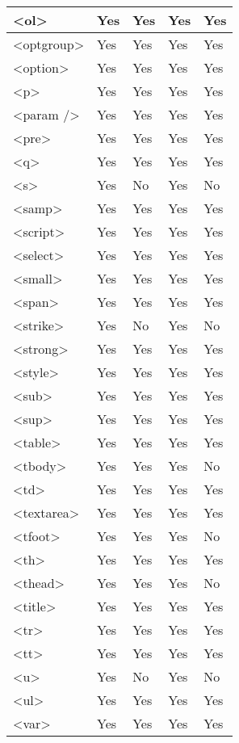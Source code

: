 \begin{longtable}{|l|l|l|l|l|}
\hline
<ol>					&Yes			&Yes	&Yes				&Yes	\\
\hline
<optgroup>			&Yes			&Yes	&Yes				&Yes	\\
\hline
<option>				&Yes			&Yes	&Yes				&Yes	\\
\hline
<p>					&Yes			&Yes	&Yes				&Yes	\\
\hline
<param />			&Yes			&Yes	&Yes				&Yes	\\
\hline
<pre>				&Yes			&Yes	&Yes				&Yes	\\
\hline
<q>					&Yes			&Yes	&Yes				&Yes	\\
\hline
<s>					&Yes			&No		&Yes				&No		\\
\hline
<samp>				&Yes			&Yes	&Yes				&Yes	\\
\hline
<script>				&Yes			&Yes	&Yes				&Yes	\\
\hline
<select>				&Yes			&Yes	&Yes				&Yes	\\
\hline
<small>				&Yes			&Yes	&Yes				&Yes	\\
\hline
<span>				&Yes			&Yes	&Yes				&Yes	\\
\hline
<strike>				&Yes			&No		&Yes				&No		\\
\hline
<strong>				&Yes			&Yes	&Yes				&Yes	\\
\hline
<style>				&Yes			&Yes	&Yes				&Yes	\\
\hline
<sub>				&Yes			&Yes	&Yes				&Yes	\\
\hline
<sup>				&Yes			&Yes	&Yes				&Yes	\\
\hline
<table>				&Yes			&Yes	&Yes				&Yes	\\
\hline
<tbody>				&Yes			&Yes	&Yes				&No		\\
\hline
<td>					&Yes			&Yes	&Yes				&Yes	\\
\hline
<textarea>			&Yes			&Yes	&Yes				&Yes	\\
\hline
<tfoot>				&Yes			&Yes	&Yes				&No		\\
\hline
<th>					&Yes			&Yes	&Yes				&Yes	\\
\hline
<thead>				&Yes			&Yes	&Yes				&No		\\
\hline
<title>				&Yes			&Yes	&Yes				&Yes	\\
\hline
<tr>					&Yes			&Yes	&Yes				&Yes	\\
\hline
<tt>					&Yes			&Yes	&Yes				&Yes	\\
\hline
<u>					&Yes			&No		&Yes				&No		\\
\hline
<ul>					&Yes			&Yes	&Yes				&Yes	\\
\hline
<var>				&Yes			&Yes	&Yes				&Yes	\\
\hline
\end{longtable}

